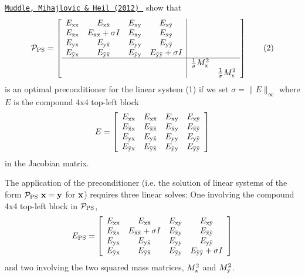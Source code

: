 \href{http://dx.doi.org/10.1016/j.jcp.2012.07.001}{\tt Muddle, Mihajlovic \& Heil (2012) } show that \[ {\cal P}_{\rm PS}=\left[ \begin{array}{cccc|cc} E_{\rm xx}&E_{\rm x\bar{\rm x}}&E_{\rm xy}&E_{\rm x\bar{\rm y}}&&\\ E_{\bar{\rm x}\rm x}&E_{\bar{\rm x}\bar{\rm x}}+\sigma I&E_{\bar{\rm x}\rm y}&E_{\bar{\rm x}\bar{\rm y}}&&\\ E_{\rm yx}&E_{\rm y\bar{\rm x}}&E_{\rm yy}&E_{\rm y\bar{\rm y}}&&\\ E_{\bar{\rm y}\rm x}&E_{\bar{\rm y}\bar{\rm x}}&E_{\bar{\rm y}\rm y}&E_{\bar{\rm y}\bar{\rm y}}+\sigma I&&\\ \hline &&&&\frac{1}{\sigma}M_{\rm x}^2&\\ &&&&&\frac{1}{\sigma}M_{\rm y}^2\\ \end{array} \right] \ \ \ \ \ \ (2) \] is an optimal preconditioner for the linear system (1) if we set $ \sigma=\|E\|_{\infty} $ where $ E $ is the compound 4x4 top-\/left block \[ E = \left[ \begin{array}{cccc} E_{\rm xx}&E_{\rm x\bar{\rm x}}&E_{\rm xy}&E_{\rm x\bar{\rm y}}\\ E_{\bar{\rm x}\rm x}&E_{\bar{\rm x}\bar{\rm x}} &E_{\bar{\rm x}\rm y}&E_{\bar{\rm x}\bar{\rm y}} \\ E_{\rm yx}&E_{\rm y\bar{\rm x}}&E_{\rm yy}&E_{\rm y\bar{\rm y}}\\ E_{\bar{\rm y}\rm x}&E_{\bar{\rm y}\bar{\rm x}}& E_{\bar{\rm y}\rm y}&E_{\bar{\rm y}\bar{\rm y}} \end{array} \right] \] in the Jacobian matrix.

The application of the preconditioner (i.\+e. the solution of linear systems of the form $ {\cal P}_{\rm PS} \ {\bf x} = {\bf y} $ for $ {\bf x} $) requires three linear solves\+: One involving the compound 4x4 top-\/left block in $ {\cal P}_{\rm PS} $, \[ E_{\rm PS}= \left[ \begin{array}{cccc} E_{\rm xx}&E_{\rm x\bar{\rm x}}&E_{\rm xy}&E_{\rm x\bar{\rm y}}\\ E_{\bar{\rm x}\rm x}&E_{\bar{\rm x}\bar{\rm x}}+\sigma I&E_{\bar{\rm x}\rm y}&E_{\bar{\rm x}\bar{\rm y}} \\ E_{\rm yx}&E_{\rm y\bar{\rm x}}&E_{\rm yy}&E_{\rm y\bar{\rm y}}\\ E_{\bar{\rm y}\rm x}&E_{\bar{\rm y}\bar{\rm x}}& E_{\bar{\rm y}\rm y}&E_{\bar{\rm y}\bar{\rm y}}+\sigma I \end{array} \right] \] and two involving the two squared mass matrices, $ M_{\rm x}^2 $ and $ M_{\rm y}^2 $.

